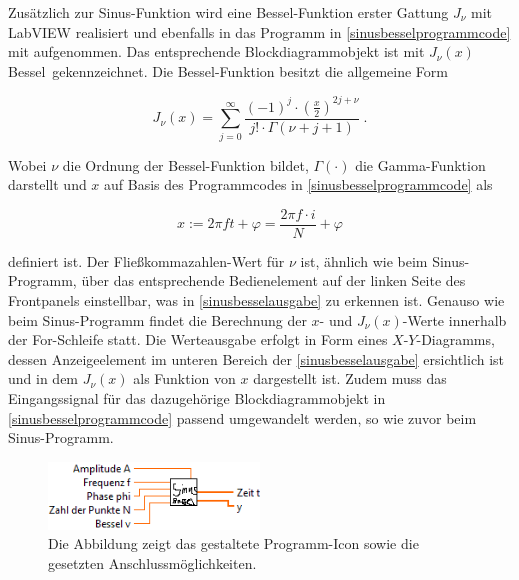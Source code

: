 \documentclass[
a4paper,
12pt,
pagesize,
ngerman
]{scrartcl}
\begin{document}
	\noindent Zusätzlich zur Sinus-Funktion wird eine Bessel-Funktion erster Gattung $J_{\nu}$ mit LabVIEW realisiert und ebenfalls in das Programm in \cref{sinusbesselprogrammcode} mit aufgenommen. Das entsprechende Blockdiagrammobjekt ist mit \glqq $J_{\nu}(x)$ Bessel\grqq\ gekennzeichnet. Die Bessel-Funktion besitzt die allgemeine Form
	
	\begin{equation}
	J_{\nu}(x) = \sum_{j=0}^{\infty}\frac{(-1)^j \cdot \left( \frac{x}{2}\right) ^{2j+\nu}}{j! \cdot \Gamma(\nu + j + 1)} \ .
	\end{equation}
	
	\noindent Wobei $\nu$ die Ordnung der Bessel-Funktion bildet, $\Gamma(\cdot)$ die Gamma-Funktion darstellt und $x$ auf Basis des Programmcodes in \cref{sinusbesselprogrammcode} als 
	
	\begin{equation}
	x := 2\pi f t + \varphi = \frac{2\pi f \cdot i}{N} + \varphi
	\end{equation}
	
	\noindent definiert ist. Der Fließkommazahlen-Wert für $\nu$ ist, ähnlich wie beim Sinus-Programm, über das entsprechende Bedienelement auf der linken Seite des Frontpanels einstellbar, was in \cref{sinusbesselausgabe} zu erkennen ist. Genauso wie beim Sinus-Programm findet die Berechnung der $x$- und $J_{\nu}(x)$-Werte innerhalb der For-Schleife statt. Die Werteausgabe erfolgt in Form eines $X$-$Y$-Diagramms, dessen Anzeigeelement im unteren Bereich der \cref{sinusbesselausgabe} ersichtlich ist und in dem $J_{\nu}(x)$ als Funktion von $x$ dargestellt ist. Zudem muss das Eingangssignal für das dazugehörige Blockdiagrammobjekt in \cref{sinusbesselprogrammcode} passend umgewandelt werden, so wie zuvor beim Sinus-Programm. 

	\begin{figure}[H]
		\centering
		\includegraphics[width=0.5\textwidth]{EIRE2018Dateien/Tag1/sinusbessel-bilder/SinusBesselc}
		\caption{Die Abbildung zeigt das gestaltete Programm-Icon sowie die gesetzten Anschlussmöglichkeiten.}
		\label{sinusbesselicon}
	\end{figure}
	
\end{document}
